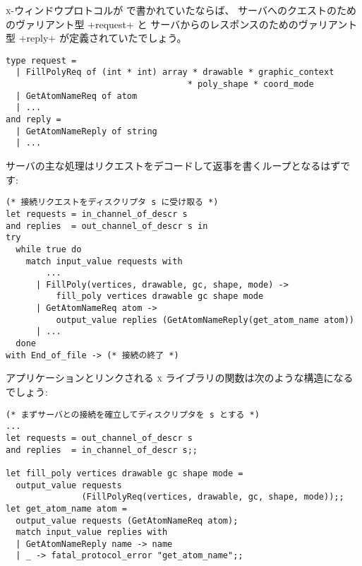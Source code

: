 \begin{example}
\textsc{x}-ウィンドウプロトコルが \ocaml で書かれていたならば、
サーバへのクエストのためのヴァリアント型 \ml+request+ と
サーバからのレスポンスのためのヴァリアント型 \ml+reply+ が定義されていたでしょう。
%
\begin{lstlisting}
type request =
  | FillPolyReq of (int * int) array * drawable * graphic_context
                                    * poly_shape * coord_mode
  | GetAtomNameReq of atom
  | ...
and reply =
  | GetAtomNameReply of string
  | ...
\end{lstlisting}
%
サーバの主な処理はリクエストをデコードして返事を書くループとなるはずです:
%
\begin{lstlisting}
(* 接続リクエストをディスクリプタ s に受け取る *)
let requests = in_channel_of_descr s
and replies  = out_channel_of_descr s in
try
  while true do
    match input_value requests with
        ...
      | FillPoly(vertices, drawable, gc, shape, mode) ->
          fill_poly vertices drawable gc shape mode
      | GetAtomNameReq atom ->
          output_value replies (GetAtomNameReply(get_atom_name atom))
      | ...
  done
with End_of_file -> (* 接続の終了 *)
\end{lstlisting}
%
アプリケーションとリンクされる \textsc{x} ライブラリの関数は次のような構造になるでしょう:
%
\begin{lstlisting}
(* まずサーバとの接続を確立してディスクリプタを s とする *)
...
let requests = out_channel_of_descr s
and replies  = in_channel_of_descr s;;

let fill_poly vertices drawable gc shape mode =
  output_value requests
               (FillPolyReq(vertices, drawable, gc, shape, mode));;
let get_atom_name atom =
  output_value requests (GetAtomNameReq atom);
  match input_value replies with
  | GetAtomNameReply name -> name
  | _ -> fatal_protocol_error "get_atom_name";;
\end{lstlisting}
\end{example}


